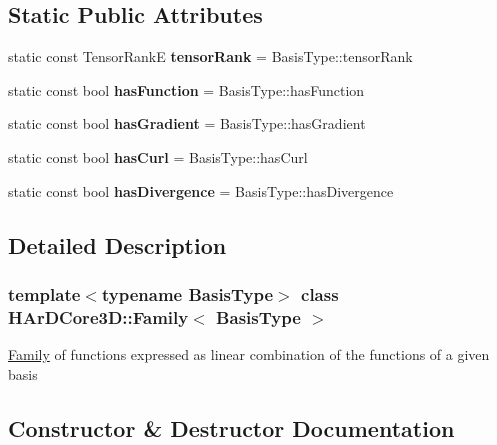 \subsection*{Static Public Attributes}
\begin{DoxyCompactItemize}
\item 
\mbox{\label{classHArDCore3D_1_1Family_a78b538f422207983374190af40e1dfec}} 
static const Tensor\+RankE {\bfseries tensor\+Rank} = Basis\+Type\+::tensor\+Rank
\item 
\mbox{\label{classHArDCore3D_1_1Family_ab00249d408f8228595197421aaf28ac6}} 
static const bool {\bfseries has\+Function} = Basis\+Type\+::has\+Function
\item 
\mbox{\label{classHArDCore3D_1_1Family_a3fcb3b85e2f26f201e608b04bdf7f926}} 
static const bool {\bfseries has\+Gradient} = Basis\+Type\+::has\+Gradient
\item 
\mbox{\label{classHArDCore3D_1_1Family_a6c12f947e8ba8dedc3ac6809481249f0}} 
static const bool {\bfseries has\+Curl} = Basis\+Type\+::has\+Curl
\item 
\mbox{\label{classHArDCore3D_1_1Family_ac905ca089d3f75eee5a4e655544b9223}} 
static const bool {\bfseries has\+Divergence} = Basis\+Type\+::has\+Divergence
\end{DoxyCompactItemize}


\subsection{Detailed Description}
\subsubsection*{template$<$typename Basis\+Type$>$\newline
class H\+Ar\+D\+Core3\+D\+::\+Family$<$ Basis\+Type $>$}

\hyperlink{classHArDCore3D_1_1Family}{Family} of functions expressed as linear combination of the functions of a given basis 

\subsection{Constructor \& Destructor Documentation}
\mbox{\label{classHArDCore3D_1_1Family_aa0576f3bfd8f5cdbdd863f147b646d15}} 
